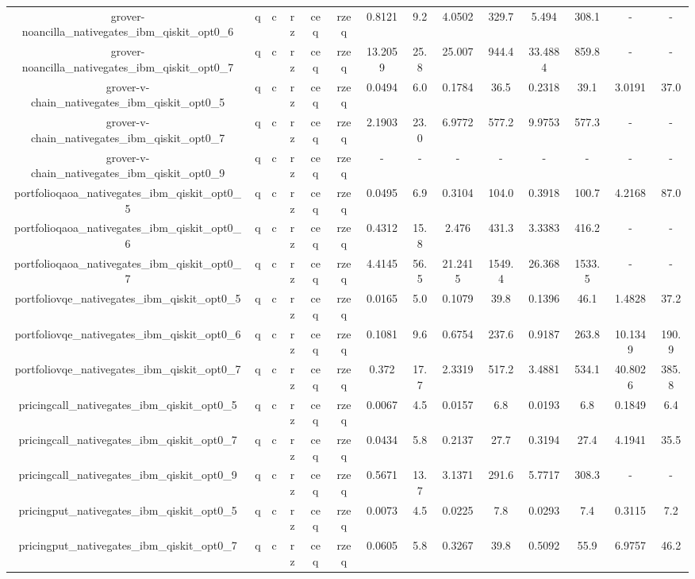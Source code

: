 \begin{table}[htb]
{\begin{tabular}{|c|c|c|c|c|c|c|c|c|c|c|c|c|c|}
grover-noancilla_nativegates_ibm_qiskit_opt0_6 & q & c & rz & ceq & rzeq & 0.8121 & 9.2 & 4.0502 & 329.7 & 5.494 & 308.1 & - & - \\ 
grover-noancilla_nativegates_ibm_qiskit_opt0_7 & q & c & rz & ceq & rzeq & 13.2059 & 25.8 & 25.007 & 944.4 & 33.4884 & 859.8 & - & - \\ 
grover-v-chain_nativegates_ibm_qiskit_opt0_5 & q & c & rz & ceq & rzeq & 0.0494 & 6.0 & 0.1784 & 36.5 & 0.2318 & 39.1 & 3.0191 & 37.0 \\ 
grover-v-chain_nativegates_ibm_qiskit_opt0_7 & q & c & rz & ceq & rzeq & 2.1903 & 23.0 & 6.9772 & 577.2 & 9.9753 & 577.3 & - & - \\ 
grover-v-chain_nativegates_ibm_qiskit_opt0_9 & q & c & rz & ceq & rzeq & - & - & - & - & - & - & - & - \\ 
portfolioqaoa_nativegates_ibm_qiskit_opt0_5 & q & c & rz & ceq & rzeq & 0.0495 & 6.9 & 0.3104 & 104.0 & 0.3918 & 100.7 & 4.2168 & 87.0 \\ 
portfolioqaoa_nativegates_ibm_qiskit_opt0_6 & q & c & rz & ceq & rzeq & 0.4312 & 15.8 & 2.476 & 431.3 & 3.3383 & 416.2 & - & - \\ 
portfolioqaoa_nativegates_ibm_qiskit_opt0_7 & q & c & rz & ceq & rzeq & 4.4145 & 56.5 & 21.2415 & 1549.4 & 26.368 & 1533.5 & - & - \\ 
portfoliovqe_nativegates_ibm_qiskit_opt0_5 & q & c & rz & ceq & rzeq & 0.0165 & 5.0 & 0.1079 & 39.8 & 0.1396 & 46.1 & 1.4828 & 37.2 \\ 
portfoliovqe_nativegates_ibm_qiskit_opt0_6 & q & c & rz & ceq & rzeq & 0.1081 & 9.6 & 0.6754 & 237.6 & 0.9187 & 263.8 & 10.1349 & 190.9 \\ 
portfoliovqe_nativegates_ibm_qiskit_opt0_7 & q & c & rz & ceq & rzeq & 0.372 & 17.7 & 2.3319 & 517.2 & 3.4881 & 534.1 & 40.8026 & 385.8 \\ 
pricingcall_nativegates_ibm_qiskit_opt0_5 & q & c & rz & ceq & rzeq & 0.0067 & 4.5 & 0.0157 & 6.8 & 0.0193 & 6.8 & 0.1849 & 6.4 \\ 
pricingcall_nativegates_ibm_qiskit_opt0_7 & q & c & rz & ceq & rzeq & 0.0434 & 5.8 & 0.2137 & 27.7 & 0.3194 & 27.4 & 4.1941 & 35.5 \\ 
pricingcall_nativegates_ibm_qiskit_opt0_9 & q & c & rz & ceq & rzeq & 0.5671 & 13.7 & 3.1371 & 291.6 & 5.7717 & 308.3 & - & - \\ 
pricingput_nativegates_ibm_qiskit_opt0_5 & q & c & rz & ceq & rzeq & 0.0073 & 4.5 & 0.0225 & 7.8 & 0.0293 & 7.4 & 0.3115 & 7.2 \\ 
pricingput_nativegates_ibm_qiskit_opt0_7 & q & c & rz & ceq & rzeq & 0.0605 & 5.8 & 0.3267 & 39.8 & 0.5092 & 55.9 & 6.9757 & 46.2 \\ 

\end{tabular}}
\end{table}
